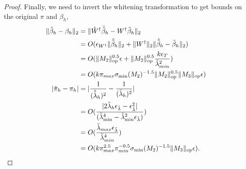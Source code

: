 \documentclass[tablecaption=bottom]{jmlr}
\newcommand\sigmamin{\sigma_\textrm{min}}
\newcommand{\Lop}{\textrm{op}}
\begin{document}
\begin{proof}
Finally, we need to invert the whitening transformation to get bounds on
the original $\pi$ and $\beta_h$,
\begin{align*}
  \|\hat \beta_h - \beta_h\|_2
  &= \| \pinv{\hat W} \hat {\tilde \beta}_h - \pinv{W} {\tilde \beta}_h \|_2 \\
  &= O( \epsilon_{\pinv{W}} \|\hat{\tilde \beta}_h\|_2 + \|\pinv{W}\|_2 \|\hat {\tilde \beta}_h - {\tilde \beta}_h\|_2 )\\
  &= O(\|M_2\|_\Lop^{0.5} \epsilon + \|M_2\|_\Lop^{0.5} \frac{k \epsilon_{T}}{\tilde \lambda_{min}^2}) \\
  &= O( k \pi_{max} \sigmamin(M_2)^{-1.5} \|M_2\|_\Lop^{0.5} \|M_3\|_\Lop \epsilon ) \\
  |\hat \pi_h - \pi_h |
  &= |\frac{1}{(\hat{\tilde{\lambda}}_h)^2} - \frac{1}{({\tilde{\lambda}}_h)^2}| \\
  &= O( \frac{|2 {\tilde \lambda}_h \epsilon_{\tilde{\lambda}} - \epsilon_{\tilde{\lambda}}^2 |}{({\tilde \lambda}_{\min}^4 - {\tilde \lambda}_{\min}^2 \epsilon_{\tilde \lambda})} ) \\
  &= O( \frac{{\tilde \lambda}_{max} \epsilon_{\tilde \lambda}}{{\tilde\lambda}_{min}^4} ) \\
  &= O( k \pi_{max}^{2.5} \pi_{min}^{-0.5} \sigmamin(M_2)^{-1.5} \|M_3\|_\Lop \epsilon ).
\end{align*}

\end{proof}
\end{document}
